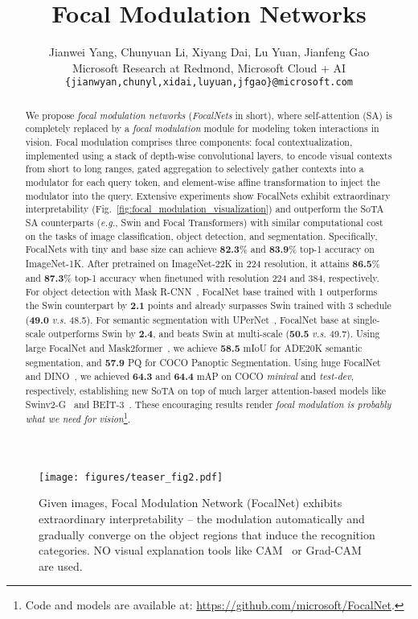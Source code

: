 \documentclass{article}
\title{Focal Modulation Networks}
\author{Jianwei Yang, Chunyuan Li, Xiyang Dai, Lu Yuan, Jianfeng Gao \\
  \small{Microsoft Research at Redmond, Microsoft Cloud + AI} \\
  \texttt{\{jianwyan,chunyl,xidai,luyuan,jfgao\}@microsoft.com} \\
}
\begin{document}
\maketitle

\vspace{-15pt}
\begin{figure}[h]
    \centering
    \texttt{[image: figures/teaser\_fig2.pdf]}
    \caption{Given images, Focal Modulation Network (FocalNet) exhibits extraordinary interpretability -- the modulation automatically and gradually converge on the object regions that induce the recognition categories. NO visual explanation tools like CAM~\cite{zhou2016learning} or Grad-CAM~\cite{selvaraju2017grad} are used.}
    \label{fig:focal_modulation_visualization}
\end{figure}

\begin{abstract}
  We propose \textit{focal modulation networks} (\emph{FocalNets} in short), where self-attention (SA) is completely replaced by a \emph{focal modulation} module for modeling token interactions in vision. Focal modulation comprises three components:  focal contextualization, implemented using a stack of depth-wise convolutional layers, to encode visual contexts from short to long ranges,  gated aggregation to selectively gather contexts into a modulator for each query token, and  element-wise affine transformation to inject the modulator into the query. Extensive experiments show FocalNets exhibit extraordinary interpretability (Fig.~\ref{fig:focal_modulation_visualization}) and outperform the SoTA SA counterparts (\textit{e.g.}, Swin and Focal Transformers) with similar computational cost on the tasks of image classification, object detection, and segmentation. Specifically, FocalNets with tiny and base size can achieve \textbf{82.3}\% and \textbf{83.9}\% top-1 accuracy on ImageNet-1K. After pretrained on ImageNet-22K in 224 resolution, it attains \textbf{86.5}\% and \textbf{87.3}\% top-1 accuracy when finetuned with resolution 224 and 384, respectively. For object detection with Mask R-CNN~\cite{he2017mask}, FocalNet base trained with 1 outperforms the Swin counterpart by \textbf{2.1} points and already surpasses Swin trained with 3 schedule (\textbf{49.0} \textit{v.s.} 48.5). For semantic segmentation with UPerNet~\cite{xiao2018unified}, FocalNet base at single-scale outperforms Swin by \textbf{2.4}, and beats Swin at multi-scale (\textbf{50.5} \textit{v.s.} 49.7). Using large FocalNet and Mask2former~\cite{cheng2022masked}, we achieve \textbf{58.5} mIoU for ADE20K semantic segmentation, and \textbf{57.9} PQ for COCO Panoptic Segmentation. Using huge FocalNet and DINO~\cite{zhang2022dino}, we achieved \textbf{64.3} and \textbf{64.4} mAP on COCO \textit{minival} and \textit{test-dev}, respectively, establishing new SoTA on top of much larger attention-based models like Swinv2-G~\cite{liu2022swin} and BEIT-3~\cite{wang2022image}. These encouraging results render \emph{focal modulation is probably what we need for vision}\footnote{Code and models are available at: \url{https://github.com/microsoft/FocalNet}.}.
\end{abstract}
\end{document}
